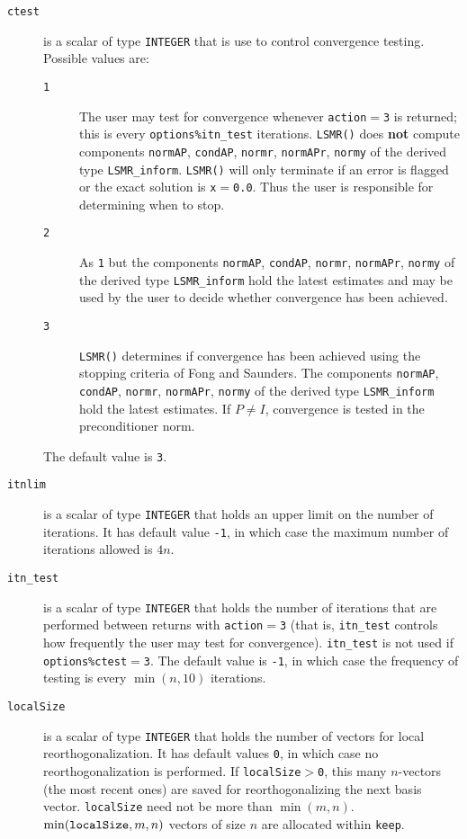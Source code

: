 \begin{description}
\item[\texttt{ctest}] is a scalar of
type {\tt INTEGER} that is use to control convergence testing. Possible values are:
\begin{description}
\item[\texttt{1}] The user may test for convergence whenever 
          {\tt action}$ = ${\tt 3} is returned; this is
          every {\tt options\%itn\_test} iterations.
          {\tt LSMR()} does {\bf not} compute components
          {\tt normAP}, {\tt condAP}, {\tt normr}, {\tt normAPr}, {\tt normy}
          of the derived type {\tt LSMR\_inform}.
         {\tt LSMR()} will only terminate if an  error is flagged
          or the exact solution is {\tt x}$ = ${\tt 0.0}.
          Thus the user is responsible for determining when to stop.
\item[\texttt{2}] As {\texttt 1} but the components
          {\tt normAP}, {\tt condAP}, {\tt normr}, {\tt normAPr}, {\tt normy}
          of the derived type {\tt LSMR\_inform} hold the latest estimates and may be used
          by the user to decide whether convergence has been achieved.
\item[\texttt{3}] {\tt LSMR()} determines if convergence has been achieved using 
          the stopping criteria of Fong and Saunders. The components
          {\tt normAP}, {\tt condAP}, {\tt normr}, {\tt normAPr}, {\tt normy}
          of the derived type {\tt LSMR\_inform} hold the latest estimates.
          If $P \neq I$,  convergence is tested in the
          preconditioner norm.
\end{description}
The default value is {\tt 3}.

   \item[\texttt{itnlim}] is a scalar of
    type {\tt INTEGER} that holds an upper limit on the number of iterations.
    It has default value {\tt -1}, in which case the 
    maximum number of iterations allowed is $4n$. 

   \item[\texttt{itn\_test}] is a scalar of
    type {\tt INTEGER} that holds the number of iterations that are performed
    between returns with {\tt action}$ = ${\tt 3} (that is, {\tt itn\_test}
    controls how frequently the user may test for convergence).
    {\tt itn\_test} is not used if {\tt options\%ctest}$=${\tt 3}.
The default value is {\tt -1}, in which case the frequency of testing is 
every $\min(n,10)$ iterations.

   \item[\texttt{localSize}] is a scalar of
type {\tt INTEGER} that holds the number of vectors for local reorthogonalization.
It has default values {\tt 0}, in which case no reorthogonalization is performed.
 If {\tt localSize}$>${\tt0}, this many $n$-vectors  (the most recent ones)
are saved for reorthogonalizing the next basis vector.
 {\tt localSize} need not be more than $\min(m,n)$.
 $\min({\tt localSize},m,n)$ vectors of size $n$ are allocated within {\tt keep}.
   

\end{description}

